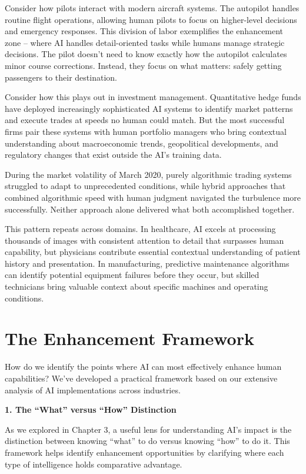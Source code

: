\documentclass[
  Letterpaper,
]{scrbook}
\begin{document}
Consider how pilots interact with modern aircraft systems. The autopilot
handles routine flight operations, allowing human pilots to focus on
higher-level decisions and emergency responses. This division of labor
exemplifies the enhancement zone -- where AI handles detail-oriented
tasks while humans manage strategic decisions. The pilot doesn't need to
know exactly how the autopilot calculates minor course corrections.
Instead, they focus on what matters: safely getting passengers to their
destination.

Consider how this plays out in investment management. Quantitative hedge
funds have deployed increasingly sophisticated AI systems to identify
market patterns and execute trades at speeds no human could match. But
the most successful firms pair these systems with human portfolio
managers who bring contextual understanding about macroeconomic trends,
geopolitical developments, and regulatory changes that exist outside the
AI's training data.

During the market volatility of March 2020, purely algorithmic trading
systems struggled to adapt to unprecedented conditions, while hybrid
approaches that combined algorithmic speed with human judgment navigated
the turbulence more successfully. Neither approach alone delivered what
both accomplished together.

This pattern repeats across domains. In healthcare, AI excels at
processing thousands of images with consistent attention to detail that
surpasses human capability, but physicians contribute essential
contextual understanding of patient history and presentation. In
manufacturing, predictive maintenance algorithms can identify potential
equipment failures before they occur, but skilled technicians bring
valuable context about specific machines and operating conditions.

\section{The Enhancement Framework}\label{the-enhancement-framework}

How do we identify the points where AI can most effectively enhance
human capabilities? We've developed a practical framework based on our
extensive analysis of AI implementations across industries.

\textbf{1. The ``What'' versus ``How'' Distinction}

As we explored in Chapter 3, a useful lens for understanding AI's impact
is the distinction between knowing ``what'' to do versus knowing ``how''
to do it. This framework helps identify enhancement opportunities by
clarifying where each type of intelligence holds comparative advantage.
\end{document}
